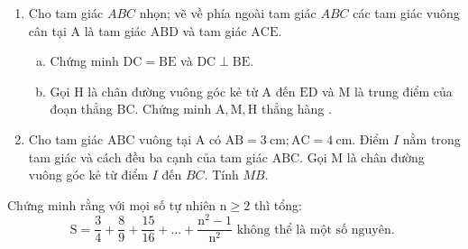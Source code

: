 \begin{bt}
    \hfill
    \begin{enumerate}[1.]
        \item Cho tam giác $A B C$ nhọn; vẽ về phía ngoài tam giác $A B C$ các tam giác vuông cân tại $\mathrm{A}$ là tam giác $\mathrm{ABD}$ và tam giác $\mathrm{ACE}$.
        \begin{enumerate}[a.]
            \item Chứng minh $\mathrm{DC}=\mathrm{BE}$ và $\mathrm{DC} \perp \mathrm{BE}$.
            \item Gọi $\mathrm{H}$ là chân đường vuông góc kẻ từ $\mathrm{A}$ đến $\mathrm{ED}$ và $\mathrm{M}$ là trung điểm của đoạn thẳng $\mathrm{BC}$. Chứng minh $\mathrm{A}, \mathrm{M}, \mathrm{H}$ thẳng hàng .
        \end{enumerate}
        \item Cho tam giác $\mathrm{ABC}$ vuông tại $\mathrm{A}$ có $\mathrm{AB}=3 \mathrm{~cm} ; \mathrm{AC}=4 \mathrm{~cm}$. Điểm $I$ nằm trong tam giác và cách đều ba cạnh của tam giác $\mathrm{ABC}$. Gọi $\mathrm{M}$ là chân đường vuông góc kẻ từ điểm $I$ đến $BC$. Tính $MB$.
    \end{enumerate}
	\loigiai{}
\end{bt}

\begin{bt}
    Chứng minh rằng với mọi số tự nhiên $\mathrm{n} \geq 2$ thì tổng:
    $$
    \mathrm{S}=\frac{3}{4}+\frac{8}{9}+\frac{15}{16}+\ldots+\frac{\mathrm{n}^2-1}{\mathrm{n}^2} \text { không thể là một số nguyên. }
    $$
\loigiai{}
\end{bt}


